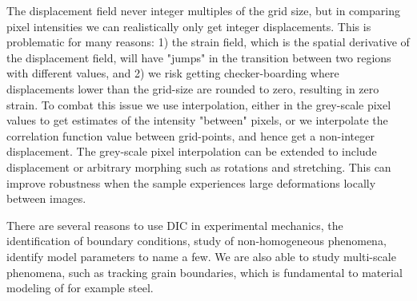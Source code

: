 The displacement field never integer multiples of the grid size, but in comparing pixel intensities we can realistically only get integer displacements. This is problematic for many reasons: 1) the strain field, which is the spatial derivative of the displacement field, will have "jumps" in the transition between two regions with different values, and 2) we risk getting checker-boarding where displacements lower than the grid-size are rounded to zero, resulting in zero strain. To combat this issue we use interpolation, either in the grey-scale pixel values to get estimates of the intensity "between" pixels, or we interpolate the correlation function value between grid-points, and hence get a non-integer displacement. The grey-scale pixel interpolation can be extended to include displacement or arbitrary morphing such as rotations and stretching. This can improve robustness when the sample experiences large deformations locally between images.  

There are several reasons to use DIC in experimental mechanics, the identification of boundary conditions, study of non-homogeneous phenomena, identify model parameters to name a few. We are also able to study multi-scale phenomena, such as tracking grain boundaries, which is fundamental to material modeling of for example steel.

